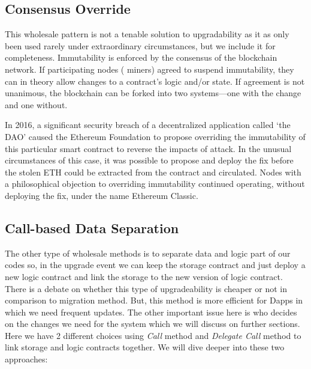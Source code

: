 
\subsection{Consensus Override}
\label{sec:hardfork}

This wholesale pattern is not a tenable solution to upgradability as it as only been used rarely under extraordinary circumstances, but we include it for completeness. Immutability is enforced by the consensus of the blockchain network. If participating nodes (
\eg miners) agreed to suspend immutability, they can in theory allow changes to a contract's logic and/or state. If agreement is not unanimous, the blockchain can be forked into two systems---one with the change and one without. 

In 2016, a significant security breach of a decentralized application called `the DAO' caused the Ethereum Foundation to propose overriding the immutability of this particular smart contract to reverse the impacts of attack. In the unusual circumstances of this case, it was possible to propose and deploy the fix before the stolen ETH could be extracted from the contract and circulated. Nodes with a philosophical objection to overriding immutability continued operating, without deploying the fix, under the name Ethereum Classic.


\subsection{Call-based Data Separation}



The other type of wholesale methods is to separate data and logic part of our codes so, in the upgrade event we can keep the storage contract and just deploy a new logic contract and link the storage to the new version of logic contract.
There is a debate on whether this type of upgradeability is cheaper or not in comparison to migration method. But, this method is more efficient for Dapps in which we need frequent updates. The other important issue here is who decides on the changes we need for the system which we will discuss on further sections.
Here we have 2 different choices using \textit{Call} method and \textit{Delegate Call} method to link storage and logic contracts together. We will dive deeper into these two approaches:


